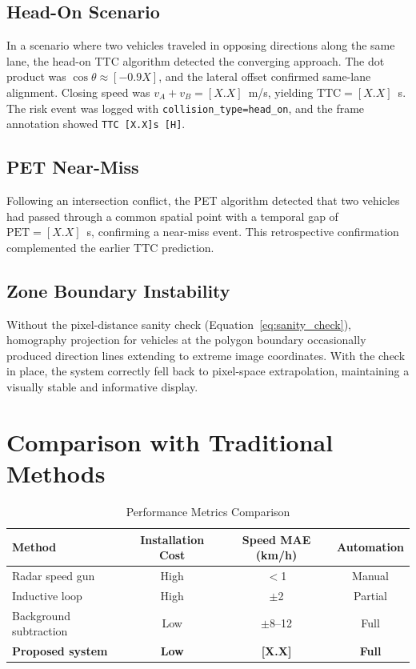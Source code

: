 \documentclass[12pt]{report}
\begin{document}
\subsection{Head-On Scenario}

In a scenario where two vehicles traveled in opposing directions along the same lane, the head-on TTC algorithm detected the converging approach.
The dot product was $\cos\theta \approx [-0.9X]$, and the lateral offset confirmed same-lane alignment.
Closing speed was $v_A + v_B = [X.X]$~m/s, yielding $\text{TTC} = [X.X]$~s.
The risk event was logged with \texttt{collision\_type=head\_on}, and the frame annotation showed \texttt{TTC [X.X]s [H]}.

\subsection{PET Near-Miss}

Following an intersection conflict, the PET algorithm detected that two vehicles had passed through a common spatial point with a temporal gap of $\text{PET} = [X.X]$~s, confirming a near-miss event.
This retrospective confirmation complemented the earlier TTC prediction.

\subsection{Zone Boundary Instability}

Without the pixel-distance sanity check (Equation~\eqref{eq:sanity_check}), homography projection for vehicles at the polygon boundary occasionally produced direction lines extending to extreme image coordinates.
With the check in place, the system correctly fell back to pixel-space extrapolation, maintaining a visually stable and informative display.

\section{Comparison with Traditional Methods}

\begin{table}[H]
    \centering
    \caption{Performance Metrics Comparison}
    \label{tab:comparison}
    \begin{tabular}{lccc}
        \toprule
        \textbf{Method} & \textbf{Installation Cost} & \textbf{Speed MAE (km/h)} & \textbf{Automation} \\
        \midrule
        Radar speed gun & High & $<$1 & Manual \\
        Inductive loop & High & $\pm$2 & Partial \\
        Background subtraction & Low & $\pm$8--12 & Full \\
        \textbf{Proposed system} & \textbf{Low} & \textbf{[X.X]} & \textbf{Full} \\
        \bottomrule
    \end{tabular}
\end{table}
\end{document}
